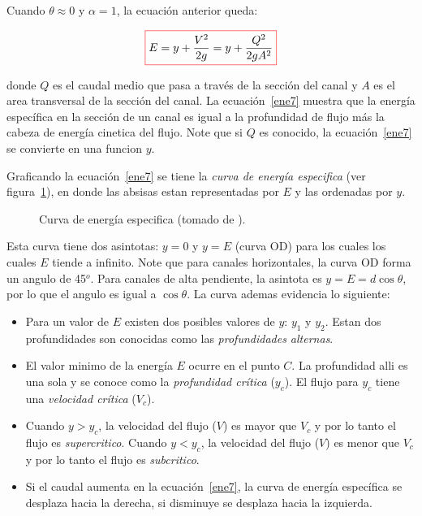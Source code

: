 \documentclass[11pt, oneside]{article}
\begin{document}
Cuando $\theta \approx 0$ y $\alpha = 1$, la ecuaci\'on anterior queda:
 
\begin{equation}
\color{red}\boxed{\color{black} E =   y  + \frac{V^2}{2g} = y + \frac{Q^2}{2g A^2 }}
\label{ene7}
\end{equation}

donde $Q$ es el caudal medio que pasa a trav\'es de la secci\'on del canal y $A$ es el area transversal de la secci\'on del canal. La ecuaci\'on~\ref{ene7} muestra que la energ\'ia espec\'ifica en la secci\'on de un canal es igual a la profundidad de flujo m\'as la cabeza de energ\'ia cinetica del flujo. Note que si $Q$ es conocido, la ecuaci\'on~\ref{ene7} se convierte en  una  funcion $y$.

Graficando la ecuaci\'on~\ref{ene7} se tiene la \emph{curva de energ\'ia especifica} (ver figura~\ref{fig10}), en donde las absisas estan representadas por $E$ y las ordenadas por $y$.
\begin{figure}[h]
\centering
\caption{Curva de energ\'ia especifica (tomado de \cite{VChow}).}
\label{fig10}
\end{figure}

Esta curva tiene dos asintotas: $y=0$ y $y=E$ (curva OD) para los cuales los cuales $E$ tiende a infinito. Note que para canales horizontales, la curva OD forma un angulo de 45$^o$. Para canales de alta pendiente, la asintota es $y=E=d \cos \theta$, por lo que el angulo es igual a $\cos \theta$. La curva ademas evidencia lo siguiente:
\begin{itemize}
\item Para un valor de $E$ existen dos posibles valores de $y$: $y_1$ y $y_2$. Estan dos profundidades son conocidas como las \emph{profundidades alternas}.
\item El valor minimo de la energ\'ia $E$ ocurre en el punto $C$. La profundidad alli es una sola y se conoce como la \emph{profundidad cr\'itica} ($y_c$). El flujo para $y_c$ tiene una \emph{velocidad cr\'itica} ($V_c$). 
\item Cuando $y > y_c$, la velocidad del flujo ($V$) es mayor que $V_c$ y por lo tanto el flujo es \emph{supercritico}. Cuando $y < y_c$, la velocidad del flujo ($V$) es menor que $V_c$ y por lo tanto el flujo es \emph{subcritico}.
\item Si el caudal aumenta en la ecuaci\'on~\ref{ene7}, la curva de energ\'ia espec\'ifica se desplaza hacia la derecha, si disminuye se desplaza hacia la izquierda. 
\end{itemize}
\end{document}
